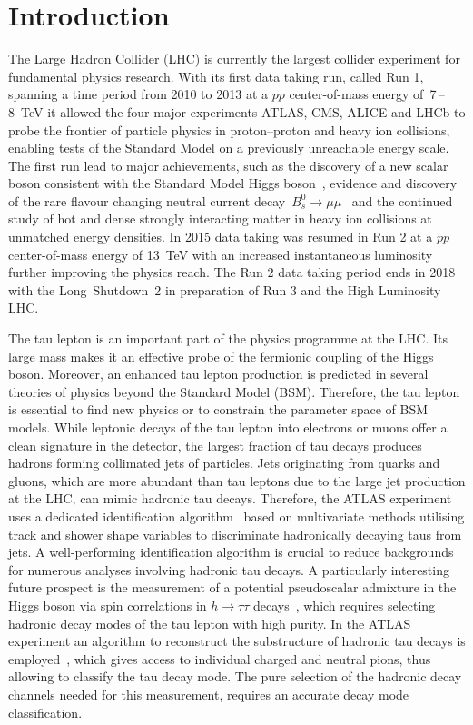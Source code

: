 \chapter*{Introduction}
\label{sec:intro}

The Large Hadron Collider (LHC) is currently the largest collider experiment for
fundamental physics research. With its first data taking run, called Run 1,
spanning a time period from 2010 to 2013 at a $pp$ center-of-mass energy
of~\num{7}\,--\,\SI{8}{\TeV} it allowed the four major experiments ATLAS, CMS,
ALICE and LHCb to probe the frontier of particle physics in proton--proton and
heavy ion collisions, enabling tests of the Standard Model on a previously
unreachable energy scale. The first run lead to major achievements, such as the
discovery of a new scalar boson consistent with the Standard Model Higgs
boson~\cite{higgs_atlas, higgs_cms}, evidence and discovery of the rare flavour
changing neutral current decay~$B_s^0 \to \mu \mu$~\cite{lhcb_bs_mumu,
  cms_bs_mumu} and the continued study of hot and dense strongly interacting
matter in heavy ion collisions at unmatched energy densities. In 2015 data
taking was resumed in Run 2 at a $pp$ center-of-mass energy of \SI{13}{\TeV}
with an increased instantaneous luminosity further improving the physics reach.
The Run 2 data taking period ends in 2018 with the Long~Shutdown~2 in
preparation of Run 3 and the High Luminosity LHC.

The tau lepton is an important part of the physics programme at the LHC. Its
large mass makes it an effective probe of the fermionic coupling of the Higgs
boson. Moreover, an enhanced tau lepton production is predicted in several
theories of physics beyond the Standard Model (BSM). Therefore, the tau lepton
is essential to find new physics or to constrain the parameter space of BSM
models. While leptonic decays of the tau lepton into electrons or muons offer a
clean signature in the detector, the largest fraction of tau decays produces
hadrons forming collimated jets of particles. Jets originating from quarks and
gluons, which are more abundant than tau leptons due to the large jet production
at the LHC, can mimic hadronic tau decays. Therefore, the ATLAS experiment uses
a dedicated identification algorithm~\cite{atlas:taurec:run1, atlas:taurec:run2}
based on multivariate methods utilising track and shower shape variables to
discriminate hadronically decaying taus from jets. A well-performing
identification algorithm is crucial to reduce backgrounds for numerous analyses
involving hadronic tau decays. A particularly interesting future prospect is the
measurement of a potential pseudoscalar admixture in the Higgs boson via spin
correlations in $h \to \tau\tau$ decays~\cite{desch_higgs_cp, harnik,
  Berge2014}, which requires selecting hadronic decay modes of the tau lepton
with high purity. In the ATLAS experiment an algorithm to reconstruct the
substructure of hadronic tau decays is employed~\cite{atlas:taurec:decaymodes},
which gives access to individual charged and neutral pions, thus allowing to
classify the tau decay mode. The pure selection of the hadronic decay channels
needed for this measurement, requires an accurate decay mode classification.

